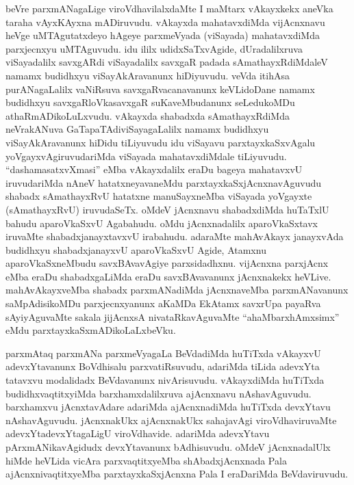 
\begin{artha}
beVre parxmANagaLige viroVdhavilalxdaMte I maMtarx vAkayxkekx aneVka taraha vAyxKAyxna mADiruvudu. vAkayxda mahatavxdiMda vijAcnxnavu heVge uMTAgutatxdeyo hAgeye parxmeVyada (viSayada) mahatavxdiMda parxjecnxyu uMTAguvudu. idu ililx udidxSaTxvAgide, dUradalilxruva viSayadalilx savxgARdi viSayadalilx savxgaR padada sAmathayxRdiMdaleV namamx budidhxyu viSayAkAravanunx hiDiyuvudu. veVda itihAsa purANagaLalilx vaNiRsuva savxgaRvacanavanunx keVLidoDane namamx budidhxyu savxgaRloVkasavxgaR suKaveMbudanunx seLedukoMDu athaRmADikoLuLxvudu. vAkayxda shabadxda sAmathayxRdiMda neVrakANuva GaTapaTAdiviSayagaLalilx namamx budidhxyu viSayAkAravanunx hiDidu tiLiyuvudu idu viSayavu parxtayxkaSxvAgalu yoVgayxvAgiruvudariMda viSayada mahatavxdiMdale tiLiyuvudu. ``dashamasatxvXmasi'' eMba vAkayxdalilx eraDu bageya mahatavxvU iruvudariMda nAneV hatatxneyavaneMdu parxtayxkaSxjAcnxnavAguvudu shabadx sAmathayxRvU hatatxne manuSayxneMba viSayada yoVgayxte (sAmathayxRvU) iruvudaSeTx. oMdeV jAcnxnavu shabadxdiMda huTaTxlU bahudu aparoVkaSxvU Agabahudu. oMdu jAcnxnadalilx aparoVkaSxtavx iruvaMte shabadxjanayxtavxvU irabahudu. adaraMte mahAvAkayx janayxvAda budidhxyu shabadxjanayxvU aparoVkaSxvU Agide, Atamxnu aparoVkaSxneMbudu savxBAvavAgiye parxsidadhxnu. vijAcnxna parxjAcnx eMba eraDu shabadxgaLiMda eraDu savxBAvavanunx jAcnxnakekx heVLive. mahAvAkayxveMba shabadx parxmANadiMda jAcnxnaveMba parxmANavanunx saMpAdisikoMDu parxjecnxyanunx aKaMDa EkAtamx savxrUpa payaRva sAyiyAguvaMte sakala jijAcnxsA nivataRkavAguvaMte  ``ahaMbarxhAmxsimx'' eMdu parxtayxkaSxmADikoLaLxbeVku.

parxmAtaq parxmANa parxmeVyagaLa BeVdadiMda huTiTxda vAkayxvU adevxYtavanunx BoVdhisalu parxvatiRsuvudu, adariMda tiLida adevxYta tatavxvu modalidadx BeVdavanunx nivArisuvudu. vAkayxdiMda huTiTxda budidhxvaqtitxyiMda barxhamxdalilxruva ajAcnxnavu nAshavAguvudu. barxhamxvu jAcnxtavAdare adariMda ajAcnxnadiMda huTiTxda devxYtavu nAshavAguvudu. jAcnxnakUkx ajAcnxnakUkx sahajavAgi viroVdhaviruvaMte adevxYtadevxYtagaLigU viroVdhavide. adariMda adevxYtavu pArxmANikavAgidudx devxYtavanunx bAdhisuvudu. oMdeV jAcnxnadalUlx hiMde heVLida vicAra parxvaqtitxyeMba shAbadxjAcnxnada Pala ajAcnxnivaqtitxyeMba parxtayxkaSxjAcnxna Pala I eraDariMda BeVdaviruvudu.
\end{artha}



